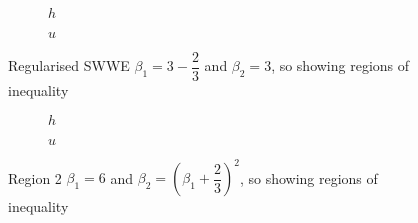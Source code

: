 \documentclass[10pt]{article}
\begin{document}
\begin{figure}
	\centering
	\begin{subfigure}{0.49\textwidth}
		\centering
		
		\caption{$h$}
	\end{subfigure}
	\begin{subfigure}{0.49\textwidth}
		\centering
		
		\caption{$u$}
	\end{subfigure}
	\caption{Regularised SWWE $\beta_1 = 3 -\dfrac{2}{3} $ and $\beta_2 = 3$, so  showing regions of inequality}
\end{figure}

\begin{figure}
	\centering
	\begin{subfigure}{0.49\textwidth}
		\centering
		
		\caption{$h$}
	\end{subfigure}
	\begin{subfigure}{0.49\textwidth}
		\centering
		
		\caption{$u$}
	\end{subfigure}
	\caption{Region 2 $\beta_1 = 6 $ and $\beta_2 = \left(\beta_1 + \dfrac{2}{3}\right)^2$, so  showing regions of inequality}
\end{figure}
\end{document}
